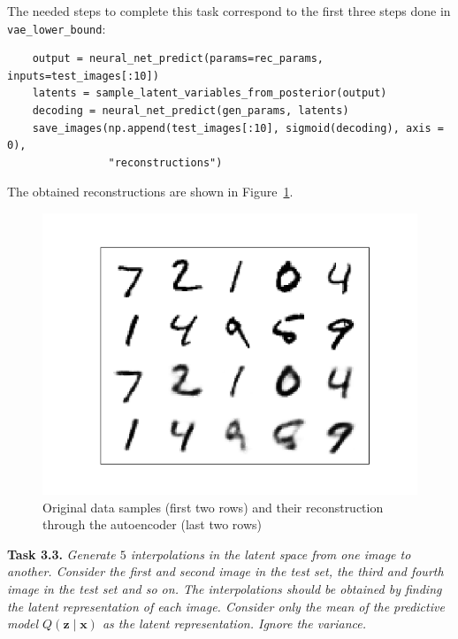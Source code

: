 \documentclass[11pt]{article}
\begin{document}
The needed steps to complete this task correspond to the first three steps done in \texttt{vae\_lower\_bound}:
\begin{verbatim}
    output = neural_net_predict(params=rec_params, inputs=test_images[:10])
    latents = sample_latent_variables_from_posterior(output)
    decoding = neural_net_predict(gen_params, latents)
    save_images(np.append(test_images[:10], sigmoid(decoding), axis = 0),
                "reconstructions")

\end{verbatim}


The obtained reconstructions are shown in Figure~\ref{img:3.2}.
\begin{figure}[H]
  \centering
  \includegraphics[scale = 0.5]{imgs/reconstructions.png}
  \caption{Original data samples (first two rows) and their reconstruction through the autoencoder (last two rows)}\label{img:3.2}
\end{figure}

\textbf{Task 3.3.} \emph{Generate \( 5 \)  interpolations in the latent space from one image to another. Consider the first and second image in the test set, the third and fourth image in the test set and so on. The interpolations should be obtained by finding the latent representation of each image. Consider only the mean of the predictive model \( Q(\bm{z} \mid \bm{x}) \)  as the latent representation. Ignore the variance.}
\end{document}
